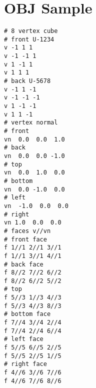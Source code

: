 \chapter{OBJ Sample}
\label{appendix-obj-sample}

\begin{lstlisting}
# 8 vertex cube
# front U-1234
v -1 1 1
v -1 -1 1
v 1 -1 1
v 1 1 1
# back U-5678
v -1 1 -1
v -1 -1 -1
v 1 -1 -1
v 1 1 -1
# vertex normal
# front
vn  0.0  0.0  1.0
# back
vn  0.0  0.0 -1.0
# top
vn  0.0  1.0  0.0
# bottom
vn  0.0 -1.0  0.0
# left
vn  -1.0  0.0  0.0
# right
vn 1.0  0.0  0.0
# faces v//vn
# front face
f 1//1 2//1 3//1
f 1//1 3//1 4//1
# back face
f 8//2 7//2 6//2
f 8//2 6//2 5//2
# top
f 5//3 1//3 4//3
f 5//3 4//3 8//3
# bottom face
f 7//4 3//4 2//4
f 7//4 2//4 6//4
# left face
f 5//5 6//5 2//5
f 5//5 2//5 1//5
# right face
f 4//6 3//6 7//6
f 4//6 7//6 8//6
\end{lstlisting}

